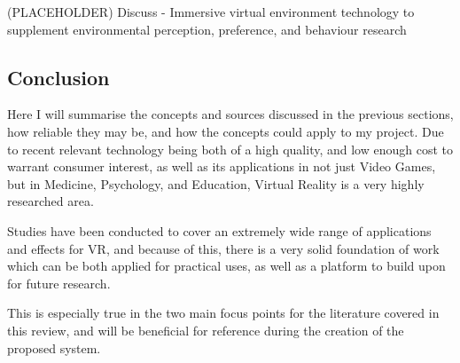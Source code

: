 \begin{multicols*}{2}

		(PLACEHOLDER) Discuss \cite{smith2015} - Immersive virtual environment technology to supplement environmental perception, preference, and behaviour research

	\subsection{Conclusion}
	\label{lr:vr:conclusion}
		Here I will summarise the concepts and sources discussed in the previous sections, how reliable they may be, and how the concepts could apply to my project.
		Due to recent relevant technology being both of a high quality, and low enough cost to warrant consumer interest, as well as its applications in not just Video Games, but in Medicine, Psychology, and Education, Virtual Reality is a very highly researched area.

		Studies have been conducted to cover an extremely wide range of applications and effects for VR, and because of this, there is a very solid foundation of work which can be both applied for practical uses, as well as a platform to build upon for future research.

		This is especially true in the two main focus points for the literature covered in this review, and will be beneficial for reference during the creation of the proposed system.

\end{multicols*}
